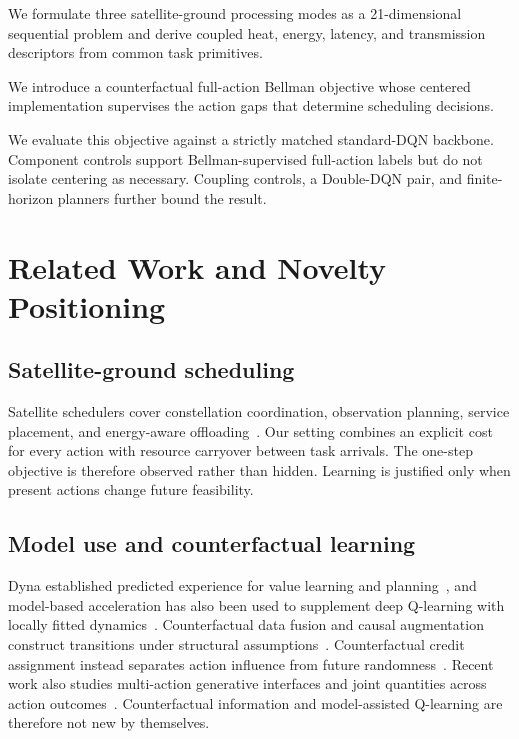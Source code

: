 \documentclass[11pt]{article}
\begin{document}
\begin{enumerate}[leftmargin=1.6em]
    \item We formulate three satellite-ground processing modes as a 21-dimensional sequential problem and derive coupled heat, energy, latency, and transmission descriptors from common task primitives.
{\color{red}%
    \item We introduce a counterfactual full-action Bellman objective whose centered implementation supervises the action gaps that determine scheduling decisions.
    \item We evaluate this objective against a strictly matched standard-DQN backbone. Component controls support Bellman-supervised full-action labels but do not isolate centering as necessary. Coupling controls, a Double-DQN pair, and finite-horizon planners further bound the result.
}%
\end{enumerate}

\section{Related Work and Novelty Positioning}

\subsection{Satellite-ground scheduling}

{\color{red}%
Satellite schedulers cover constellation coordination, observation planning, service placement, and energy-aware offloading~\cite{RN8,RN10,RN20,RN22,RN23,RN27,RN28}. Our setting combines an explicit cost for every action with resource carryover between task arrivals. The one-step objective is therefore observed rather than hidden. Learning is justified only when present actions change future feasibility.
}%

\subsection{Model use and counterfactual learning}

{\color{red}%
Dyna established predicted experience for value learning and planning~\cite{sutton1991dyna}, and model-based acceleration has also been used to supplement deep Q-learning with locally fitted dynamics~\cite{gu2016continuous}. Counterfactual data fusion and causal augmentation construct transitions under structural assumptions~\cite{forney2017counterfactual,armengol2024caiac}. Counterfactual credit assignment instead separates action influence from future randomness~\cite{mesnard2021counterfactual}. Recent work also studies multi-action generative interfaces and joint quantities across action outcomes~\cite{kaya2026joint}. Counterfactual information and model-assisted Q-learning are therefore not new by themselves.
}%
\end{document}
